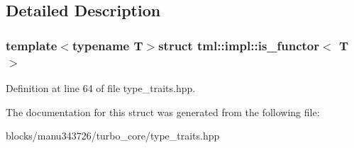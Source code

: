 \subsection{Detailed Description}
\subsubsection*{template$<$typename T$>$struct tml\+::impl\+::is\+\_\+functor$<$ T $>$}



Definition at line 64 of file type\+\_\+traits.\+hpp.



The documentation for this struct was generated from the following file\+:\begin{DoxyCompactItemize}
\item 
blocks/manu343726/turbo\+\_\+core/type\+\_\+traits.\+hpp\end{DoxyCompactItemize}
